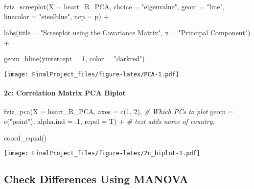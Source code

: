 \documentclass[
]{article}
\newenvironment{Shaded}{\begin{snugshade}}{\end{snugshade}}
\newcommand{\AttributeTok}[1]{\textcolor[rgb]{0.77,0.63,0.00}{#1}}
\newcommand{\CommentTok}[1]{\textcolor[rgb]{0.56,0.35,0.01}{\textit{#1}}}
\newcommand{\DecValTok}[1]{\textcolor[rgb]{0.00,0.00,0.81}{#1}}
\newcommand{\FunctionTok}[1]{\textcolor[rgb]{0.00,0.00,0.00}{#1}}
\newcommand{\NormalTok}[1]{#1}
\newcommand{\SpecialCharTok}[1]{\textcolor[rgb]{0.00,0.00,0.00}{#1}}
\newcommand{\StringTok}[1]{\textcolor[rgb]{0.31,0.60,0.02}{#1}}
\begin{document}
\begin{Shaded}
\begin{Highlighting}[]
\FunctionTok{fviz\_screeplot}\NormalTok{(}\AttributeTok{X =}\NormalTok{ heart\_R\_PCA,}
               \AttributeTok{choice =} \StringTok{"eigenvalue"}\NormalTok{,}
               \AttributeTok{geom =} \StringTok{"line"}\NormalTok{,}
               \AttributeTok{linecolor =} \StringTok{"steelblue"}\NormalTok{,}
               \AttributeTok{ncp =}\NormalTok{ p) }\SpecialCharTok{+} 
  
  \FunctionTok{labs}\NormalTok{(}\AttributeTok{title =} \StringTok{"Screeplot using the Covariance Matrix"}\NormalTok{,}
       \AttributeTok{x =} \StringTok{"Principal Component"}\NormalTok{) }\SpecialCharTok{+} 
  
  \FunctionTok{geom\_hline}\NormalTok{(}\AttributeTok{yintercept =} \DecValTok{1}\NormalTok{,}
             \AttributeTok{color =} \StringTok{"darkred"}\NormalTok{)}
\end{Highlighting}
\end{Shaded}

\texttt{[image: FinalProject\_files/figure-latex/PCA-1.pdf]}

\hypertarget{c-correlation-matrix-pca-biplot}{%
\paragraph{2c: Correlation Matrix PCA
Biplot}\label{c-correlation-matrix-pca-biplot}}

\begin{Shaded}
\begin{Highlighting}[]
\FunctionTok{fviz\_pca}\NormalTok{(}\AttributeTok{X =}\NormalTok{ heart\_R\_PCA,}
         \AttributeTok{axes =} \FunctionTok{c}\NormalTok{(}\DecValTok{1}\NormalTok{, }\DecValTok{2}\NormalTok{),              }\CommentTok{\# Which PCs to plot}
         \AttributeTok{geom =} \FunctionTok{c}\NormalTok{(}\StringTok{"point"}\NormalTok{), }
         \AttributeTok{alpha.ind =}\NormalTok{ .}\DecValTok{1}\NormalTok{, }
         \AttributeTok{repel =}\NormalTok{ T)  }\SpecialCharTok{+}   \CommentTok{\# text adds name of country.}

  \FunctionTok{coord\_equal}\NormalTok{()}
\end{Highlighting}
\end{Shaded}

\texttt{[image: FinalProject\_files/figure-latex/2c\_biplot-1.pdf]}

\hypertarget{check-differences-using-manova}{%
\subsection{Check Differences Using
MANOVA}\label{check-differences-using-manova}}
\end{document}
